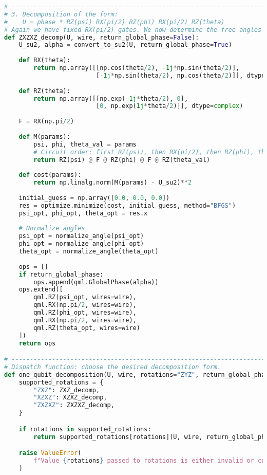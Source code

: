 \documentclass[12pt,twoside]{report}  %
\begin{document}
\begin{lstlisting}[language=Python, caption={Python code for one_qubit_decomposition.}]
# -----------------------------------------------------------------------------
# 3. Decomposition of the form:
#    U = phase * RZ(psi) RX(pi/2) RZ(phi) RX(pi/2) RZ(theta)
# Again we have fixed RX(pi/2) gates. We now determine the free angles psi, phi, theta.
def ZXZXZ_decomp(U, wire, return_global_phase=False):
    U_su2, alpha = convert_to_su2(U, return_global_phase=True)
    
    def RX(theta):
        return np.array([[np.cos(theta/2), -1j*np.sin(theta/2)],
                         [-1j*np.sin(theta/2), np.cos(theta/2)]], dtype=complex)
    
    def RZ(theta):
        return np.array([[np.exp(-1j*theta/2), 0],
                         [0, np.exp(1j*theta/2)]], dtype=complex)
    
    F = RX(np.pi/2)
    
    def M(params):
        psi, phi, theta_val = params
        # Circuit order: first RZ(psi), then RX(pi/2), then RZ(phi), then RX(pi/2), then RZ(theta)
        return RZ(psi) @ F @ RZ(phi) @ F @ RZ(theta_val)
    
    def cost(params):
        return np.linalg.norm(M(params) - U_su2)**2
    
    initial_guess = np.array([0.0, 0.0, 0.0])
    res = optimize.minimize(cost, initial_guess, method="BFGS")
    psi_opt, phi_opt, theta_opt = res.x
    
    # Normalize angles
    psi_opt = normalize_angle(psi_opt)
    phi_opt = normalize_angle(phi_opt)
    theta_opt = normalize_angle(theta_opt)
    
    ops = []
    if return_global_phase:
        ops.append(qml.GlobalPhase(alpha))
    ops.extend([
        qml.RZ(psi_opt, wires=wire),
        qml.RX(np.pi/2, wires=wire),
        qml.RZ(phi_opt, wires=wire),
        qml.RX(np.pi/2, wires=wire),
        qml.RZ(theta_opt, wires=wire)
    ])
    return ops

# -----------------------------------------------------------------------------
# Dispatch function: choose the desired decomposition form.
def one_qubit_decomposition(U, wire, rotations="ZYZ", return_global_phase=False):
    supported_rotations = {
        "ZXZ": ZXZ_decomp,
        "XZXZ": XZXZ_decomp,
        "ZXZXZ": ZXZXZ_decomp,
    }

    if rotations in supported_rotations:
        return supported_rotations[rotations](U, wire, return_global_phase)

    raise ValueError(
        f"Value {rotations} passed to rotations is either invalid or currently unsupported."
    )
    
\end{lstlisting}
\end{document}

